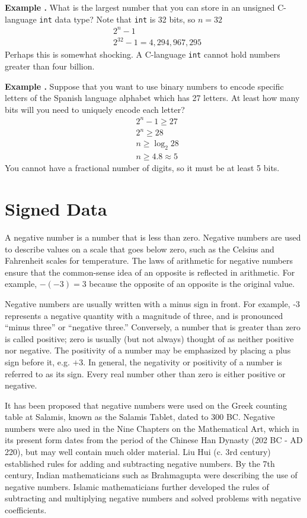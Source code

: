 \documentclass[letterpaper, 12pt]{book}
\newcommand*{\example}[1]{\noindent
    \colorbox{blue!10}{\noindent
        \begin{minipage}{\textwidth}
            \textbf{Example \thechapter.\arabic{examples}}\stepcounter{examples}
            #1
        \end{minipage}
    }
}
\begin{document}
\example{What is the largest number that you can store in an unsigned C-language \texttt{int} data type? %
Note that \texttt{int} is 32 bits, so $n=32$
\begin{align*}%
    & 2^n-1 \\
    & 2^{32} - 1 = 4,294,967,295
\end{align*}%
Perhaps this is somewhat shocking. A C-language \texttt{int} cannot hold numbers greater than four billion.
}

\example{Suppose that you want to use binary numbers to encode specific letters of the Spanish language %
alphabet which has 27 letters. At least how many bits will you need to uniquely encode each letter?
\begin{align*}
    & 2^n-1 \geq 27 \\
    & 2^n \geq 28 \\
    & n \geq \log_2 28 \\
    & n \geq 4.8 \approx 5
\end{align*}
You cannot have a fractional number of digits, so it must be at least 5 bits.
}

\chapter{Signed Data}

A negative number is a number that is less than zero. Negative numbers are used to describe 
values on a scale that goes below zero, such as the Celsius and Fahrenheit scales for 
temperature. The laws of arithmetic for negative numbers ensure that the common-sense idea 
of an opposite is reflected in arithmetic. For example, $-(-3) = 3$ because the opposite of 
an opposite is the original value.

Negative numbers are usually written with a minus sign in front. For example, -3 represents a 
negative quantity with a magnitude of three, and is pronounced ``minus three'' or ``negative 
three.'' Conversely, a number that is greater than zero is called positive; zero is usually 
(but not always) thought of as neither positive nor negative. The positivity of a number may 
be emphasized by placing a plus sign before it, e.g. $+3$. In general, the negativity or 
positivity of a number is referred to as its sign. %
%
Every real number other than zero is either positive or negative. 

It has been proposed that negative numbers were used on the Greek counting table at Salamis, known as the Salamis Tablet, 
dated to 300 BC. Negative numbers were also used in the Nine Chapters on the Mathematical Art, which in its present form 
dates from the period of the Chinese Han Dynasty (202 BC - AD 220), but may well contain much older material. Liu Hui 
(c. 3rd century) established rules for adding and subtracting negative numbers. By the 7th century, Indian mathematicians 
such as Brahmagupta were describing the use of negative numbers. Islamic mathematicians further developed the rules of 
subtracting and multiplying negative numbers and solved problems with negative coefficients. 
\end{document}
